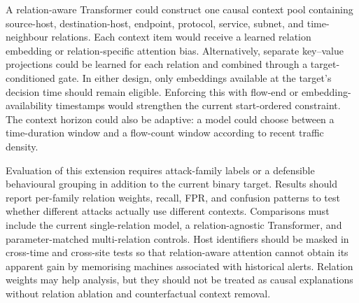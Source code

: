 \documentclass[11pt,fleqn]{report}
\begin{document}
A relation-aware Transformer could construct one causal context pool containing source-host, destination-host, endpoint, protocol, service, subnet, and time-neighbour relations. Each context item would receive a learned relation embedding or relation-specific attention bias. Alternatively, separate key--value projections could be learned for each relation and combined through a target-conditioned gate. In either design, only embeddings available at the target's decision time should remain eligible. Enforcing this with flow-end or embedding-availability timestamps would strengthen the current start-ordered constraint. The context horizon could also be adaptive: a model could choose between a time-duration window and a flow-count window according to recent traffic density.

Evaluation of this extension requires attack-family labels or a defensible behavioural grouping in addition to the current binary target. Results should report per-family relation weights, recall, FPR, and confusion patterns to test whether different attacks actually use different contexts. Comparisons must include the current single-relation model, a relation-agnostic Transformer, and parameter-matched multi-relation controls. Host identifiers should be masked in cross-time and cross-site tests so that relation-aware attention cannot obtain its apparent gain by memorising machines associated with historical alerts. Relation weights may help analysis, but they should not be treated as causal explanations without relation ablation and counterfactual context removal.


\end{document}
